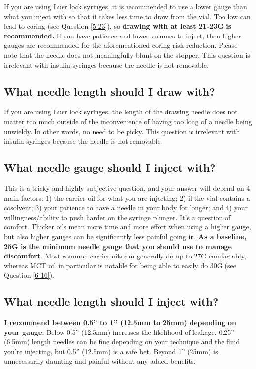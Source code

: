 \documentclass{article}
\begin{document}
If you are using Luer lock syringes, it is recommended to use a lower gauge than what you inject with so that it takes less time to draw from the vial. Too low can lead to coring (see Question \ref{5-23}), so \textbf{drawing with at least 21-23G is recommended.} If you have patience and lower volumes to inject, then higher gauges are recommended for the aforementioned coring risk reduction. Please note that the needle does not meaningfully blunt on the stopper. This question is irrelevant with insulin syringes because the needle is not removable.

\subsection{What needle length should I draw with?}

If you are using Luer lock syringes, the length of the drawing needle does not matter too much outside of the inconvenience of having too long of a needle being unwieldy. In other words, no need to be picky. This question is irrelevant with insulin syringes because the needle is not removable.

\subsection{What needle gauge should I inject with?}\label{5-16}

This is a tricky and highly subjective question, and your answer will depend on 4 main factors: 1) the carrier oil for what you are injecting; 2) if the vial contains a cosolvent; 3) your patience to have a needle in your body for longer; and 4) your willingness/ability to push harder on the syringe plunger. It’s a question of comfort. Thicker oils mean more time and more effort when using a higher gauge, but also higher gauges can be significantly less painful going in. \textbf{As a baseline, 25G is the minimum needle gauge that you should use to manage discomfort.} Most common carrier oils can generally do up to 27G comfortably, whereas MCT oil in particular is notable for being able to easily do 30G (see Question \ref{6-16}).

\subsection{What needle length should I inject with?}

\textbf{I recommend between 0.5” to 1” (12.5mm to 25mm) depending on your gauge.} Below 0.5” (12.5mm) increases the likelihood of leakage. 0.25” (6.5mm) length needles can be fine depending on your technique and the fluid you’re injecting, but 0.5” (12.5mm) is a safe bet. Beyond 1” (25mm) is unnecessarily daunting and painful without any added benefits.
\end{document}
